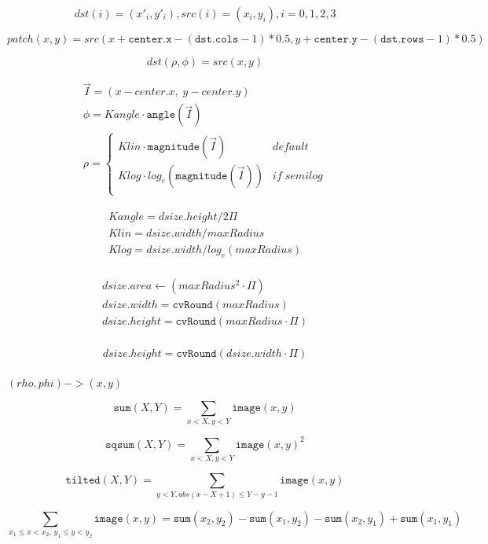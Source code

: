 \documentclass{article}
\begin{document}
\[dst(i)=(x'_i,y'_i), src(i)=(x_i, y_i), i=0,1,2,3\]
\pagebreak

\[patch(x, y) = src(x + \texttt{center.x} - ( \texttt{dst.cols} -1)*0.5, y + \texttt{center.y} - ( \texttt{dst.rows} -1)*0.5)\]
\pagebreak

\[ dst(\rho , \phi ) = src(x,y) \]
\pagebreak

\[ \begin{array}{l} \vec{I} = (x - center.x, \;y - center.y) \\ \phi = Kangle \cdot \texttt{angle} (\vec{I}) \\ \rho = \left\{\begin{matrix} Klin \cdot \texttt{magnitude} (\vec{I}) & default \\ Klog \cdot log_e(\texttt{magnitude} (\vec{I})) & if \; semilog \\ \end{matrix}\right. \end{array} \]
\pagebreak

\[ \begin{array}{l} Kangle = dsize.height / 2\Pi \\ Klin = dsize.width / maxRadius \\ Klog = dsize.width / log_e(maxRadius) \\ \end{array} \]
\pagebreak

\[\begin{array}{l} dsize.area \leftarrow (maxRadius^2 \cdot \Pi) \\ dsize.width = \texttt{cvRound}(maxRadius) \\ dsize.height = \texttt{cvRound}(maxRadius \cdot \Pi) \\ \end{array}\]
\pagebreak

\[\begin{array}{l} dsize.height = \texttt{cvRound}(dsize.width \cdot \Pi) \\ \end{array} \]
\pagebreak

$(rho, phi)->(x, y)$
\pagebreak

\[\texttt{sum} (X,Y) = \sum _{x<X,y<Y} \texttt{image} (x,y)\]
\pagebreak

\[\texttt{sqsum} (X,Y) = \sum _{x<X,y<Y} \texttt{image} (x,y)^2\]
\pagebreak

\[\texttt{tilted} (X,Y) = \sum _{y<Y,abs(x-X+1) \leq Y-y-1} \texttt{image} (x,y)\]
\pagebreak

\[\sum _{x_1 \leq x < x_2, \, y_1 \leq y < y_2} \texttt{image} (x,y) = \texttt{sum} (x_2,y_2)- \texttt{sum} (x_1,y_2)- \texttt{sum} (x_2,y_1)+ \texttt{sum} (x_1,y_1)\]
\pagebreak
\end{document}
